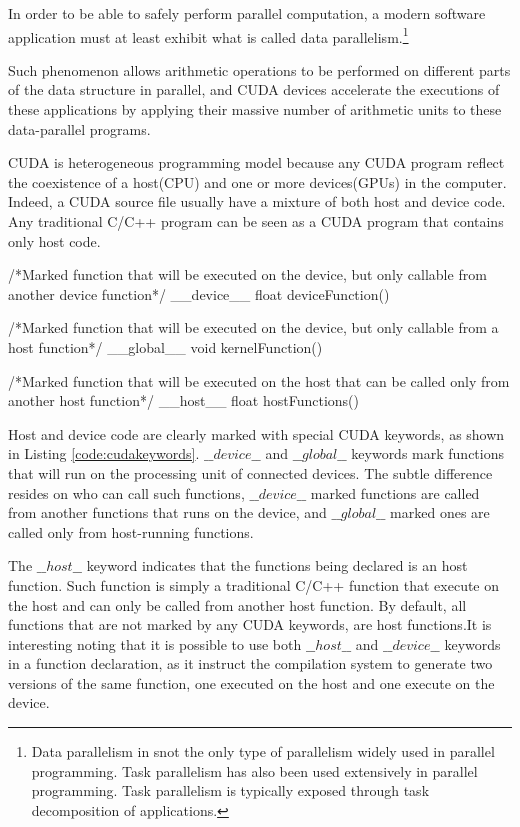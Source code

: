 \documentclass[12pt,a4paper]{extarticle}
\newcommand{\linespace}{\vspace{8pt}}
\begin{document}
In order to be able to safely perform parallel computation, a modern software application must at least exhibit what is called data parallelism.\footnote{Data parallelism in snot the only type of parallelism widely used in parallel programming. Task parallelism has also been used extensively in parallel programming. Task parallelism is typically exposed through task decomposition of applications.\cite{KirkHwu_2014:3}}

Such phenomenon allows arithmetic operations to be performed on different parts of the data structure in parallel, and CUDA devices accelerate the executions of these applications by applying their massive number of arithmetic units to these data-parallel programs.
\linespace

CUDA is heterogeneous programming model because any CUDA program reflect the coexistence of a host(CPU) and one or more devices(GPUs) in the computer. Indeed, a CUDA source file usually have a mixture of both host and device code.
Any traditional C/C++ program can be seen as a CUDA program that contains only host code.

\begin{cpp}[caption={CUDA keywords for function declarations},label=code:cudakeywords]
/*Marked function that will be executed on the device, but only 
	callable from another device function*/
__device__ float deviceFunction()

/*Marked function that will be executed on the device, but only 
	callable from a host function*/
__global__ void kernelFunction()

/*Marked function that will be executed on the host that can be 
	called only from another host function*/
__host__ float hostFunctions()
\end{cpp}


Host and device code are clearly marked with special CUDA keywords, as shown in Listing \ref{code:cudakeywords}. $\_\_device\_\_$ and $\_\_global\_\_$ keywords mark functions that will run on the processing unit of connected devices. The subtle difference resides on who can call such functions, $\_\_device\_\_$ marked functions are called from another functions that runs on the device, and $\_\_global\_\_$ marked ones are called only from host-running functions. 
\linespace

The $\_\_host\_\_$ keyword indicates that the functions being declared is an host function. Such function is simply a traditional C/C++ function that execute on the host and can only be called from another host function. By default, all functions that are not marked by any CUDA keywords, are host functions.It is interesting noting that it is possible to use both $\_\_host\_\_$ and $\_\_device\_\_$ keywords in a function declaration, as it instruct the compilation system to generate two versions of the same function, one executed on the host and one execute on the device.
\linespace
\end{document}
